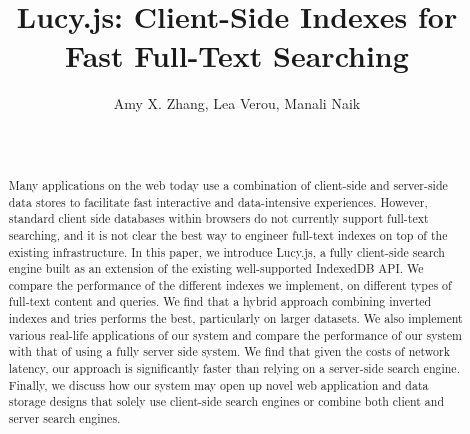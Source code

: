 \documentclass{vldb}
\begin{document}

\title{Lucy.js: Client-Side Indexes for Fast Full-Text Searching}




\author{
\alignauthor Amy X. Zhang, Lea Verou, Manali Naik\\
\vspace{.2cm}
	\\
	 \\
}

\maketitle

\begin{abstract}

Many applications on the web today use a combination of client-side and server-side data stores to facilitate fast interactive and data-intensive experiences. 
However, standard client side databases within browsers do not currently support full-text searching, and it is not clear the best way to engineer full-text indexes on top of the existing infrastructure.
In this paper, we introduce Lucy.js, a fully client-side search engine built as an extension of the existing well-supported IndexedDB API.
We compare the performance of the different indexes we implement, on different types of full-text content and queries. We find that a hybrid approach combining inverted indexes and tries performs the best, particularly on larger datasets.
We also implement various real-life applications of our system and compare the performance of our system with that of using a fully server side system. We find that given the costs of network latency, our approach is significantly faster than relying on a server-side search engine.
Finally, we discuss how our system may open up novel web application and data storage designs that solely use client-side search engines or combine both client and server search engines.
\end{abstract}
\end{document}
